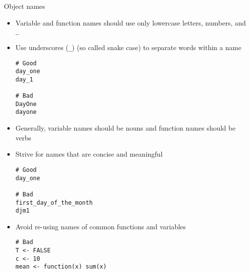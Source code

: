 \documentclass[aspectratio=169]{beamer}
\begin{document}
\begin{frame}{Object names}
  \begin{itemize}
    \item Variable and function names should use only lowercase letters,
      numbers, and \verb+_+
    \item Use underscores (\verb+_+) (so called snake case) to separate words
      within a name
  \begin{lstlisting}[identifierstyle = \bfseries\color{iwmgray}]
# Good
day_one
day_1

# Bad
DayOne
dayone
  \end{lstlisting}
  \framebreak

    \item Generally, variable names should be nouns and function names should be
      verbs
    \item Strive for names that are concise and meaningful
      \begin{lstlisting}[identifierstyle = \bfseries\color{iwmgray}]
# Good
day_one

# Bad
first_day_of_the_month
djm1
  \end{lstlisting}
  \framebreak

    \item Avoid re-using names of common functions and variables
  \begin{lstlisting}
# Bad
T <- FALSE
c <- 10
mean <- function(x) sum(x)
  \end{lstlisting}
  \end{itemize}
\end{frame}
\end{document}

